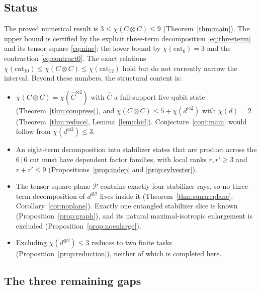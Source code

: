 \documentclass[11pt]{article}
\theoremstyle{plain}
\theoremstyle{definition}
\newcommand{\cat}{\mathrm{cat}}
\begin{document}
\subsection{Status}

The proved numerical result is $3\le\chi(C\otimes C)\le9$
(Theorem~\ref{thm:main}). The upper bound is certified by the explicit three-term
decomposition \eqref{eq:threeterm} and its tensor square \eqref{eq:nine}; the lower
bound by $\chi(\cat_6)=3$ and the contraction \eqref{eq:contract0}. The exact relations
$\chi(\cat_{10})\le\chi(C\otimes C)\le\chi(\cat_{12})$ hold but do not currently narrow
the interval. Beyond these numbers, the structural content is:

\begin{itemize}[leftmargin=*]
\item $\chi(C\otimes C)=\chi(\widehat C^{\otimes2})$ with $\widehat C$ a full-support
five-qubit state (Theorem~\ref{thm:compress}), and
$\chi(C\otimes C)\le5+\chi(d^{\otimes2})$ with $\chi(d)=2$
(Theorem~\ref{thm:reduce}, Lemma~\ref{lem:chid}). Conjecture~\ref{conj:main} would
follow from $\chi(d^{\otimes2})\le3$.
\item An eight-term decomposition into stabilizer states that are product across the
$6\,|\,6$ cut must have dependent factor families, with local ranks $r,r'\ge3$ and
$r+r'\le9$ (Propositions~\ref{prop:indep} and \ref{prop:sylvester}).
\item The tensor-square plane $\mathcal P$ contains exactly four stabilizer rays, so no
three-term decomposition of $d^{\otimes2}$ lives inside it
(Theorem~\ref{thm:squareplane}, Corollary~\ref{cor:noplane}). Exactly one entangled
stabilizer slice is known (Proposition~\ref{prop:graph}), and its natural
maximal-isotropic enlargement is excluded (Proposition~\ref{prop:noenlarge}).
\item Excluding $\chi(d^{\otimes2})\le3$ reduces to two finite tasks
(Proposition~\ref{prop:reduction}), neither of which is completed here.
\end{itemize}

\subsection{The three remaining gaps}
\end{document}
